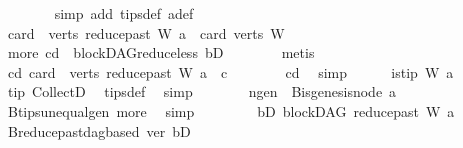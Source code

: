 \begin{isabellebody}
\ \ \ \ \ \ \isamarkupfalse%
\ {\isacharparenleft}{\kern0pt}simp\ add{\isacharcolon}{\kern0pt}\ tips{\isacharunderscore}{\kern0pt}def\ a{\isacharunderscore}{\kern0pt}def{\isacharparenright}{\kern0pt}\ \isanewline
\ \ \ \ \isamarkupfalse%
\ \isamarkupfalse%
\ {\isachardoublequoteopen}card\ {\isacharparenleft}{\kern0pt}\ verts\ {\isacharparenleft}{\kern0pt}reduce{\isacharunderscore}{\kern0pt}past\ W\ a{\isacharparenright}{\kern0pt}{\isacharparenright}{\kern0pt}\ {\isacharless}{\kern0pt}\ card\ {\isacharparenleft}{\kern0pt}verts\ W{\isacharparenright}{\kern0pt}{\isachardoublequoteclose}\isanewline
\ \ \ \ \ \ \isamarkupfalse%
\ more\ cd\ \ blockDAG{\isachardot}{\kern0pt}reduce{\isacharunderscore}{\kern0pt}less\ bD\isanewline
\ \ \ \ \ \ \isamarkupfalse%
\ metis\ \isanewline
\ \ \ \ \isamarkupfalse%
\ \isamarkupfalse%
\ cd{}{\isacharcolon}{\kern0pt}\ {\isachardoublequoteopen}card\ {\isacharparenleft}{\kern0pt}\ verts\ {\isacharparenleft}{\kern0pt}reduce{\isacharunderscore}{\kern0pt}past\ W\ a{\isacharparenright}{\kern0pt}{\isacharparenright}{\kern0pt}\ {\isacharless}{\kern0pt}\ c{\isachardoublequoteclose}\isanewline
\ \ \ \ \ \ \isamarkupfalse%
\ cd\ \isamarkupfalse%
\ simp\isanewline
\ \ \ \ \isamarkupfalse%
\ {\isachardoublequoteopen}is{\isacharunderscore}{\kern0pt}tip\ W\ a{\isachardoublequoteclose}\ \isamarkupfalse%
\ tip\ CollectD\ \isamarkupfalse%
\ tips{\isacharunderscore}{\kern0pt}def\ \isamarkupfalse%
\ simp\isanewline
\ \ \ \ \isamarkupfalse%
\ \isamarkupfalse%
\ n{\isacharunderscore}{\kern0pt}gen{\isacharcolon}{\kern0pt}\ {\isachardoublequoteopen}{\isasymnot}\ B{\isachardot}{\kern0pt}is{\isacharunderscore}{\kern0pt}genesis{\isacharunderscore}{\kern0pt}node\ a{\isachardoublequoteclose}\isanewline
\ \ \ \ \ \ \isamarkupfalse%
\ B{\isachardot}{\kern0pt}tips{\isacharunderscore}{\kern0pt}unequal{\isacharunderscore}{\kern0pt}gen\ more\ \isamarkupfalse%
\ simp\ \isanewline
\ \ \ \ \isamarkupfalse%
\ \isamarkupfalse%
\ bD{}{\isacharcolon}{\kern0pt}\ {\isachardoublequoteopen}blockDAG\ {\isacharparenleft}{\kern0pt}reduce{\isacharunderscore}{\kern0pt}past\ W\ a{\isacharparenright}{\kern0pt}{\isachardoublequoteclose}\isanewline
\ \ \ \ \ \ \isamarkupfalse%
\ B{\isachardot}{\kern0pt}reduce{\isacharunderscore}{\kern0pt}past{\isacharunderscore}{\kern0pt}dagbased\ ver\ bD\ \isamarkupfalse%

\end{isabellebody}
